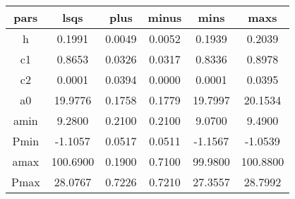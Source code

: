 \begin{table}
\begin{tabular}{cccccc}
\hline \hline
pars & lsqs & plus & minus & mins & maxs \\
\hline
h & 0.1991 & 0.0049 & 0.0052 & 0.1939 & 0.2039 \\
c1 & 0.8653 & 0.0326 & 0.0317 & 0.8336 & 0.8978 \\
c2 & 0.0001 & 0.0394 & 0.0000 & 0.0001 & 0.0395 \\
a0 & 19.9776 & 0.1758 & 0.1779 & 19.7997 & 20.1534 \\
amin & 9.2800 & 0.2100 & 0.2100 & 9.0700 & 9.4900 \\
Pmin & -1.1057 & 0.0517 & 0.0511 & -1.1567 & -1.0539 \\
amax & 100.6900 & 0.1900 & 0.7100 & 99.9800 & 100.8800 \\
Pmax & 28.0767 & 0.7226 & 0.7210 & 27.3557 & 28.7992 \\
\hline
\end{tabular}
\end{table}
